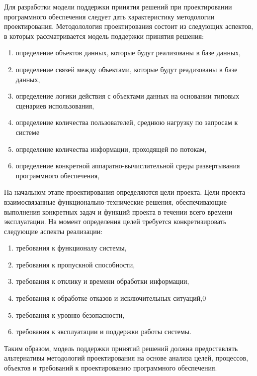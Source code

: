 Для разработки модели поддержки принятия решений при проектировании программного обеспечения следует дать характеристику методологии проектирования. Методолология проектирования состоит из следующих аспектов, в которых рассматривается модель поддержки принятия решения:
\begin{enumerate}
    \item  определение объектов данных, которые будут реализованы в базе данных,
    \item  определение связей между объектами, которые будут реадизованы в базе данных,
    \item  определение логики действия с объектами данных на основании типовых сценариев использования,
    \item  определение количества пользователей, среднюю нагрузку по запросам к системе
    \item  определение количества информации, проходящей по потокам,
    \item  определение конкретной аппаратно-вычислительной среды развертывания программного обеспечения,
\end{enumerate}
На начальном этапе проектирования определяются цели проекта. Цели проекта - взаимосвязанные функционально-технические решения, обеспечивающие выполнения конкретных задач и функций проекта в течении всего времени эксплуатации. На момент определения целей требуется конкретизировать следующие аспекты реализации:
\begin{enumerate}
    \item  требования к функционалу системы,
    \item  требования к пропускной способности,
    \item  требования к отклику и времени обработки информации,
    \item  требования к обработке отказов и исключительных ситуаций,0
    \item  требования к уровню безопасности,
    \item  требования к эксплуатации и поддержки работы системы.
\end{enumerate} 
Таким образом, модель поддержки принятий решений должна предоставлять альтернативы методологий проектирования на основе анализа целей, процессов, объектов и требований к проектированию программного обеспечения.

